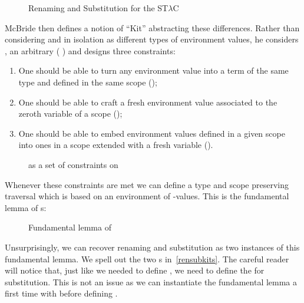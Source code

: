 \begin{figure}[h]
\caption{Renaming\label{ren} and Substitution\label{sub} for the ST$λ$C}
\end{figure}

McBride then defines a notion of ``Kit'' abstracting these differences.
Rather than considering  and  in isolation as different
types of environment values, he considers , an arbitrary
( ) and designs three constraints:

\begin{enumerate}
  \item
    One should be able to turn any environment value into a term of
    the same type and defined in the same scope ();
  \item
    One should be able to craft a fresh environment value associated
    to the zeroth variable of a scope ();
  \item
    One should be able to embed environment values defined in a given
    scope into ones in a scope extended with a fresh variable ().
\end{enumerate}

\begin{figure}[h]
\caption{ as a set of constraints on }
\end{figure}

Whenever these constraints are met we can define a type and scope preserving
traversal which is based on an environment of -values. This is the
fundamental lemma of s:

\begin{figure}[h]
\caption{Fundamental lemma of }
\end{figure}

Unsurprisingly, we can recover renaming and substitution as two instances
of this fundamental lemma. We spell out the two s in~\cref{rensubkits}. The careful
reader will notice that, just like we needed  to define ,
we need  to define the  for substitution. This is not an
issue as we can instantiate the fundamental lemma a first time with
 before defining .

